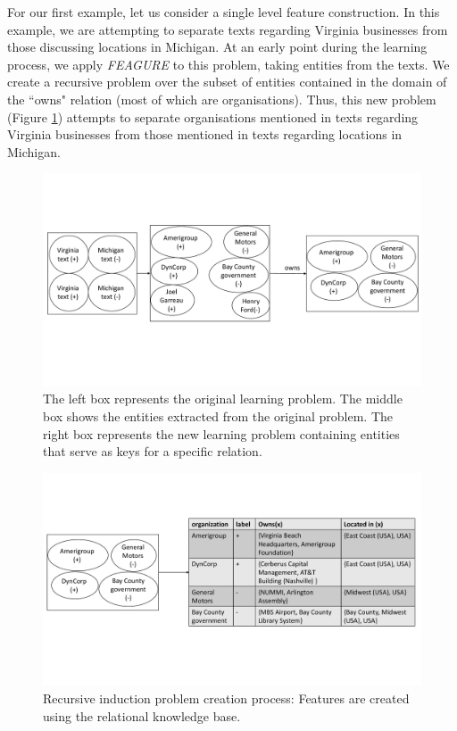 \documentclass[twoside,11pt]{article}
\theoremstyle{definition}
\begin{document}
For our first example, let us consider a single level feature construction.
In this example, we are attempting to separate texts regarding Virginia businesses from those discussing locations in Michigan. At an early point during the learning process, we apply \emph{FEAGURE} to this problem, taking entities from the texts. We create a recursive problem over the subset of entities contained in the domain of the ``owns" relation (most of which are organisations). Thus, this new problem (Figure \ref{fig:figure_rec1_example}) attempts to separate organisations mentioned in texts regarding Virginia businesses from those mentioned in texts regarding locations in Michigan.

\begin{figure}[!h]
	\centering
	\includegraphics[width=\linewidth]{figure_rec1_example_new}
	\caption{The left box represents the original learning problem. The middle box shows the entities extracted from the original problem. The right box represents the new learning problem containing entities that serve as keys for a specific relation.}
	\label{fig:figure_rec1_example}
\end{figure}

\begin{figure}[!h]
	\centering
	\includegraphics[width=\linewidth]{figure_rec1_problem_new}
	\caption{Recursive induction problem creation process: Features are created using the relational knowledge base.}
	\label{fig:figure_rec1_problem}
\end{figure}
\end{document}
